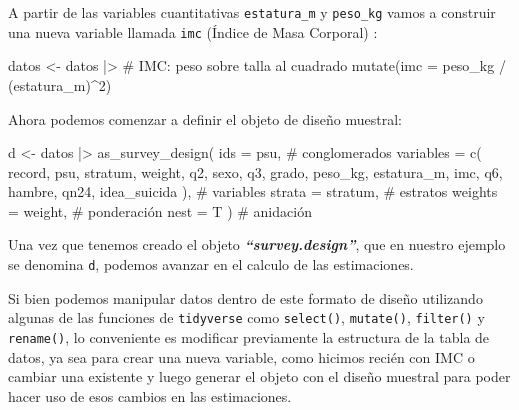 \documentclass[
  spanish,
  a4paper,
]{scrbook}
\newenvironment{Shaded}{\begin{snugshade}}{\end{snugshade}}
\newcommand{\AttributeTok}[1]{\textcolor[rgb]{0.40,0.45,0.13}{#1}}
\newcommand{\CommentTok}[1]{\textcolor[rgb]{0.37,0.37,0.37}{#1}}
\newcommand{\DecValTok}[1]{\textcolor[rgb]{0.68,0.00,0.00}{#1}}
\newcommand{\FunctionTok}[1]{\textcolor[rgb]{0.28,0.35,0.67}{#1}}
\newcommand{\NormalTok}[1]{\textcolor[rgb]{0.00,0.23,0.31}{#1}}
\newcommand{\OtherTok}[1]{\textcolor[rgb]{0.00,0.23,0.31}{#1}}
\newcommand{\SpecialCharTok}[1]{\textcolor[rgb]{0.37,0.37,0.37}{#1}}
\begin{document}
A partir de las variables cuantitativas \texttt{estatura\_m} y
\texttt{peso\_kg} vamos a construir una nueva variable llamada
\texttt{imc} (Índice de Masa Corporal) :

\begin{Shaded}
\begin{Highlighting}[]
\NormalTok{datos }\OtherTok{\textless{}{-}}\NormalTok{ datos }\SpecialCharTok{|\textgreater{}}
  \CommentTok{\# IMC: peso sobre talla al cuadrado}
  \FunctionTok{mutate}\NormalTok{(}\AttributeTok{imc =}\NormalTok{ peso\_kg }\SpecialCharTok{/}\NormalTok{ (estatura\_m)}\SpecialCharTok{\^{}}\DecValTok{2}\NormalTok{)}
\end{Highlighting}
\end{Shaded}

Ahora podemos comenzar a definir el objeto de diseño muestral:

\begin{Shaded}
\begin{Highlighting}[]
\NormalTok{d }\OtherTok{\textless{}{-}}\NormalTok{ datos }\SpecialCharTok{|\textgreater{}}
  \FunctionTok{as\_survey\_design}\NormalTok{(}
    \AttributeTok{ids =}\NormalTok{ psu, }\CommentTok{\# conglomerados}
    \AttributeTok{variables =} \FunctionTok{c}\NormalTok{(}
\NormalTok{      record,}
\NormalTok{      psu,}
\NormalTok{      stratum,}
\NormalTok{      weight,}
\NormalTok{      q2,}
\NormalTok{      sexo,}
\NormalTok{      q3,}
\NormalTok{      grado,}
\NormalTok{      peso\_kg,}
\NormalTok{      estatura\_m,}
\NormalTok{      imc,}
\NormalTok{      q6,}
\NormalTok{      hambre,}
\NormalTok{      qn24,}
\NormalTok{      idea\_suicida}
\NormalTok{    ), }\CommentTok{\# variables}
    \AttributeTok{strata =}\NormalTok{ stratum, }\CommentTok{\# estratos}
    \AttributeTok{weights =}\NormalTok{ weight, }\CommentTok{\# ponderación}
    \AttributeTok{nest =}\NormalTok{ T}
\NormalTok{  ) }\CommentTok{\# anidación}
\end{Highlighting}
\end{Shaded}

Una vez que tenemos creado el objeto \textbf{\emph{``survey.design''}},
que en nuestro ejemplo se denomina \texttt{d}, podemos avanzar en el
calculo de las estimaciones.

Si bien podemos manipular datos dentro de este formato de diseño
utilizando algunas de las funciones de \texttt{tidyverse} como
\texttt{select()}, \texttt{mutate()}, \texttt{filter()} y
\texttt{rename()}, lo conveniente es modificar previamente la estructura
de la tabla de datos, ya sea para crear una nueva variable, como hicimos
recién con IMC o cambiar una existente y luego generar el objeto con el
diseño muestral para poder hacer uso de esos cambios en las
estimaciones.
\end{document}
